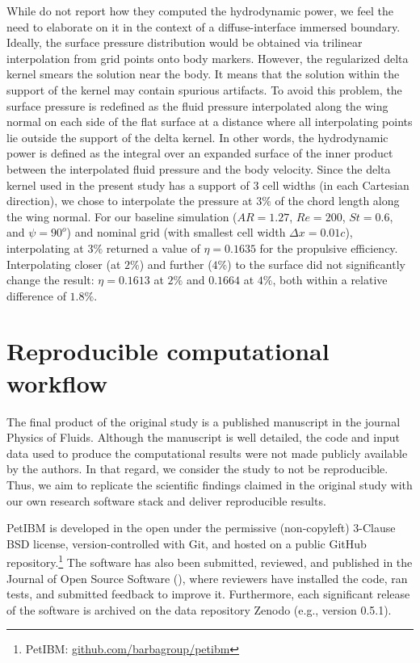 While \citet{li_dong_2016} do not report how they computed the hydrodynamic power, we feel the need to elaborate on it in the context of a diffuse-interface immersed boundary.
Ideally, the surface pressure distribution would be obtained via trilinear interpolation from grid points onto body markers.
However, the regularized delta kernel smears the solution near the body.
It means that the solution within the support of the kernel may contain spurious artifacts.
To avoid this problem, the surface pressure is redefined as the fluid pressure interpolated along the wing normal on each side of the flat surface at a distance where all interpolating points lie outside the support of the delta kernel.
In other words, the hydrodynamic power is defined as the integral over an expanded surface of the inner product between the interpolated fluid pressure and the body velocity.
Since the delta kernel used in the present study has a support of $3$ cell widths (in each Cartesian direction), we chose to interpolate the pressure at $3\%$ of the chord length along the wing normal.
For our baseline simulation ($AR = 1.27$, $Re = 200$, $St = 0.6$, and $\psi = 90^o$) and nominal grid (with smallest cell width $\Delta x = 0.01 c$), interpolating at $3\%$ returned a value of $\eta = 0.1635$ for the propulsive efficiency.
Interpolating closer (at $2\%$) and further ($4\%$) to the surface did not significantly change the result: $\eta = 0.1613$ at $2\%$ and $0.1664$ at $4\%$, both within a relative difference of $1.8\%$.

\section{Reproducible computational workflow}

The final product of the original study is a published manuscript in the journal Physics of Fluids.
Although the manuscript is well detailed, the code and input data used to produce the computational results were not made publicly available by the authors.
In that regard, we consider the study to not be reproducible.
Thus, we aim to replicate the scientific findings claimed in the original study with our own research software stack and deliver reproducible results.

PetIBM is developed in the open under the permissive (non-copyleft) 3-Clause BSD license, version-controlled with Git, and hosted on a public GitHub repository.\footnote{PetIBM: \url{github.com/barbagroup/petibm}}
The software has also been submitted, reviewed, and published in the Journal of Open Source Software (\citet{chuang_et_al_2018}), where reviewers have installed the code, ran tests, and submitted feedback to improve it.
Furthermore, each significant release of the software is archived on the data repository Zenodo (e.g., version 0.5.1\supercite{mesnard_et_al_2020_zenodo_petibm}).

